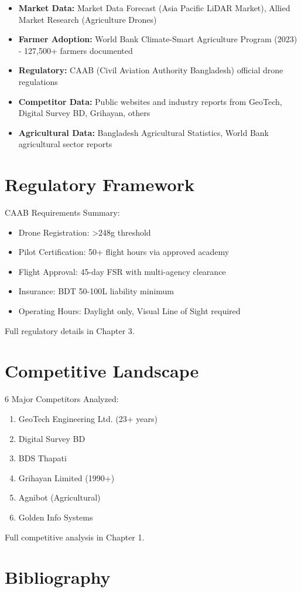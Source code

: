 \documentclass[12pt,a4paper,oneside]{book}
\begin{document}
\begin{itemize}
    \item \textbf{Market Data:} Market Data Forecast (Asia Pacific LiDAR Market), Allied Market Research (Agriculture Drones)
    \item \textbf{Farmer Adoption:} World Bank Climate-Smart Agriculture Program (2023) - 127,500+ farmers documented
    \item \textbf{Regulatory:} CAAB (Civil Aviation Authority Bangladesh) official drone regulations
    \item \textbf{Competitor Data:} Public websites and industry reports from GeoTech, Digital Survey BD, Grihayan, others
    \item \textbf{Agricultural Data:} Bangladesh Agricultural Statistics, World Bank agricultural sector reports
\end{itemize}

\section{Regulatory Framework}

CAAB Requirements Summary:
\begin{itemize}
    \item Drone Registration: >248g threshold
    \item Pilot Certification: 50+ flight hours via approved academy
    \item Flight Approval: 45-day FSR with multi-agency clearance
    \item Insurance: BDT 50-100L liability minimum
    \item Operating Hours: Daylight only, Visual Line of Sight required
\end{itemize}

Full regulatory details in Chapter 3.

\section{Competitive Landscape}

6 Major Competitors Analyzed:
\begin{enumerate}
    \item GeoTech Engineering Ltd. (23+ years)
    \item Digital Survey BD
    \item BDS Thapati
    \item Grihayan Limited (1990+)
    \item Agnibot (Agricultural)
    \item Golden Info Systems
\end{enumerate}

Full competitive analysis in Chapter 1.

\section{Bibliography}

\printbibliography

\end{document}
